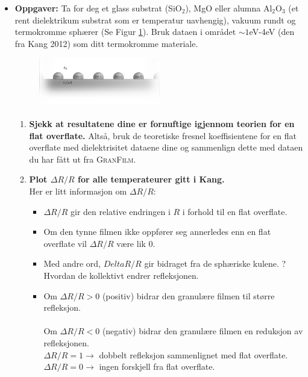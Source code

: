 \begin{itemize}
\item \textbf{Oppgaver:}
   Ta for deg et glass substrat (SiO$_2$), MgO eller alumna Al$_2$O$_3$ (et rent dielektrikum
   substrat som er temperatur uavhengig), vakuum rundt og termokromme sphærer (Se Figur \ref{fig:granular}).
   Bruk dataen i området $\sim 1$eV-4eV (den fra Kang 2012) som ditt termokromme materiale.
   \begin{figure}[h!]
     \centering
      \includegraphics[width=0.5\textwidth]{granularFilm1.pdf}
      \caption{
      }
      \label{fig:granular}
   \end{figure}
   \begin{enumerate}
      \item
         \textbf{Sjekk at resultatene dine er fornuftige igjennom teorien for en flat overflate.}
         Altså, bruk de teoretiske fresnel koeffisientene for en flat overflate med dielektrisitet
         dataene dine og sammenlign dette med dataen du har fått ut fra \textsc{GranFilm}.

         \item
            \textbf{Plot $\Delta R/R$ for alle temperateurer gitt i Kang.} \\
            Her er litt informasjon om $\Delta R/R$:
            \begin{itemize}
               \item $\Delta R/R$ gir den relative endringen i $R$ i forhold til en flat overflate.

            \item Om den tynne filmen ikke oppfører seg annerledes enn en flat overflate
               vil $\Delta R/R$ være lik 0.
            \item Med andre ord, $Delta R/R$ gir bidraget fra de sphæriske kulene. ?Hvordan de kollektivt
               endrer refleksjonen. 
            \item Om $\Delta R/R > 0$ (positiv) bidrar den granulære filmen til større refleksjon.\\
               \\
            Om $\Delta R/R < 0$ (negativ) bidrar den granulære filmen en reduksjon av refleksjonen.
               \\
            $\Delta R/R = 1 \rightarrow $ dobbelt refleksjon sammenlignet med flat overflate.
               \\
            $\Delta R/R = 0 \rightarrow $ ingen forskjell fra flat overflate.


\end{itemize}
\end{enumerate}
\end{itemize}
